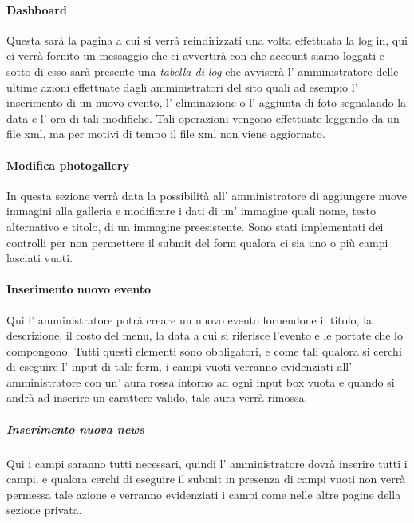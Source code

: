\paragraph{Dashboard}
Questa sarà la pagina a cui si verrà reindirizzati una volta effettuata la log in, qui ci verrà fornito un messaggio che ci avvertirà con che account siamo loggati e sotto di esso sarà presente una \emph{tabella di log} che avviserà l' amministratore delle ultime azioni effettuate dagli amministratori del sito quali ad esempio l' inserimento di un nuovo evento, l' eliminazione o l' aggiunta di foto segnalando la data e l' ora di tali modifiche. Tali operazioni vengono effettuate leggendo da un file xml, ma per motivi di tempo il file xml non viene aggiornato.
\paragraph{Modifica photogallery}
In questa sezione verrà data la possibilità all' amministratore di aggiungere nuove immagini alla galleria e modificare i dati di un' immagine quali nome, testo alternativo e titolo, di un immagine preesistente. Sono stati implementati dei controlli per non permettere il submit del form qualora ci sia uno o più campi lasciati vuoti.
\paragraph{Inserimento nuovo evento}
Qui l' amministratore potrà creare un nuovo evento fornendone il titolo, la descrizione, il costo del menu, la data a cui si riferisce l'evento e le portate che lo compongono. Tutti questi elementi sono obbligatori, e come tali qualora si cerchi di eseguire l' input di tale form, i campi vuoti verranno evidenziati all' amministratore con un' aura rossa intorno ad ogni input box vuota e quando si andrà ad inserire un carattere valido, tale aura verrà rimossa.
\subparagraph{Inserimento nuova news}
Qui i campi saranno tutti necessari, quindi l' amministratore dovrà inserire tutti i campi, e qualora cerchi di eseguire il submit in presenza di campi vuoti non verrà permessa tale azione e verranno evidenziati i campi come nelle altre pagine della sezione privata.

